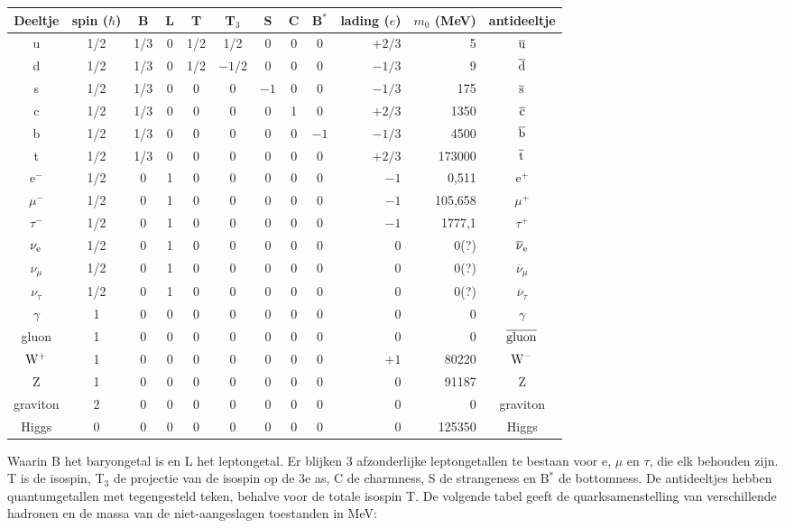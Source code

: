 \documentclass[twoside]{report}
\begin{document}
\begin{center}
\begin{tabular}{||c|c@{}cccccccrr|c||}
\hline
Deeltje&spin ($\hbar$)&B&L&T&T$_3$&S&C&B$^*$&lading ($e$)&$m_0$ (MeV)&antideeltje\\
\hline
\hline
u&1/2&1/3&0&1/2&1/2   &0 &0 &0&$+2/3$&   5&$\overline{\rm u}$\\
d&1/2&1/3&0&1/2&$-1/2$&0 &0 &0&$-1/3$&   9&$\overline{\rm d}$\\
s&1/2&1/3&0&  0&0&$-1$&0 &0 &$-1/3$&   175&$\overline{\rm s}$\\
c&1/2&1/3&0&  0&0&0 &1 &0   &$+2/3$&  1350&$\overline{\rm c}$\\
b&1/2&1/3&0&  0&0&0 &0 &$-1$&$-1/3$&  4500&$\overline{\rm b}$\\
t&1/2&1/3&0&  0&0&0 &0 &0   &$+2/3$&173000&$\overline{\rm t}$\\
\hline
e$^-$        &1/2&0&1&0&0&0&0&0&$-1$&0,511&e$^+$\\
$\mu^-$      &1/2&0&1&0&0&0&0&0&$-1$&105,658&$\mu^+$\\
$\tau^-$     &1/2&0&1&0&0&0&0&0&$-1$&1777,1&$\tau^+$\\
$\nu_{\rm e}$&1/2&0&1&0&0&0&0&0&0&0(?)&$\overline{\nu}_{\rm e}$\\
$\nu_\mu$    &1/2&0&1&0&0&0&0&0&0&0(?)&$\overline{\nu}_{\mu}$\\
$\nu_\tau$   &1/2&0&1&0&0&0&0&0&0&0(?)&$\overline{\nu}_{\tau}$\\
\hline
$\gamma$ &1&0&0&0&0&0&0&0&$0$&0&$\gamma$\\
gluon    &1&0&0&0&0&0&0&0&$0$&0&$\overline{\rm gluon}$\\
$\rm W^+$&1&0&0&0&0&0&0&0&$+1$&80220&$\rm W^-$\\
Z        &1&0&0&0&0&0&0&0&$0$&91187&Z\\
graviton &2&0&0&0&0&0&0&0&$0$&0&graviton\\
\hline
Higgs    &0&0&0&0&0&0&0&0&$0$&125350&Higgs\\
\hline
\end{tabular}
\end{center}
Waarin B het baryongetal is en L het leptongetal. Er blijken 3 afzonderlijke
leptongetallen te bestaan voor e, $\mu$ en $\tau$, die elk behouden zijn. T
is de isospin, T$_3$ de projectie van de isospin op de 3e as, C de charmness,
S de strangeness en B$^*$ de bottomness. De antideeltjes hebben
quantumgetallen met tegengesteld teken, behalve voor de totale isospin T. De
volgende tabel geeft de quarksamenstelling van verschillende hadronen en de
massa van de niet-aangeslagen toestanden in MeV:
\end{document}
